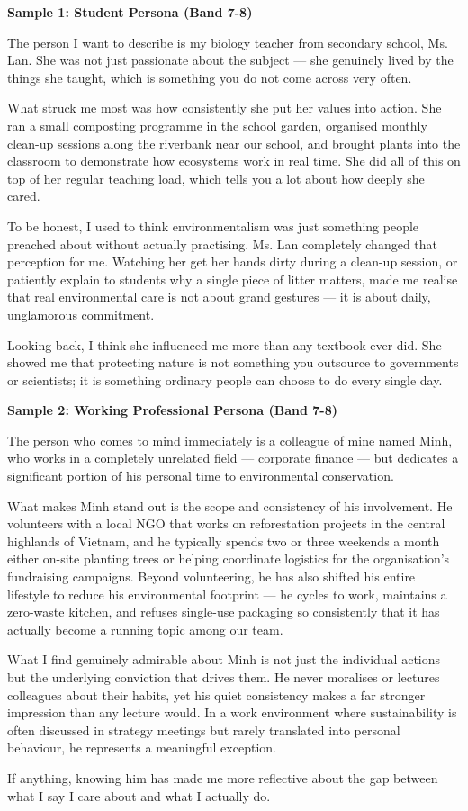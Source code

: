 \begin{ieltsanswer}
\textbf{Sample 1: Student Persona (Band 7-8)}

The person I want to describe is my biology teacher from secondary school, Ms. Lan. She was not just passionate about the subject — she genuinely lived by the things she taught, which is something you do not come across very often.

What struck me most was how consistently she put her values into action. She ran a small composting programme in the school garden, organised monthly clean-up sessions along the riverbank near our school, and brought plants into the classroom to demonstrate how ecosystems work in real time. She did all of this on top of her regular teaching load, which tells you a lot about how deeply she cared.

To be honest, I used to think environmentalism was just something people preached about without actually practising. Ms. Lan completely changed that perception for me. Watching her get her hands dirty during a clean-up session, or patiently explain to students why a single piece of litter matters, made me realise that real environmental care is not about grand gestures — it is about daily, unglamorous commitment.

Looking back, I think she influenced me more than any textbook ever did. She showed me that protecting nature is not something you outsource to governments or scientists; it is something ordinary people can choose to do every single day.

\textbf{Sample 2: Working Professional Persona (Band 7-8)}

The person who comes to mind immediately is a colleague of mine named Minh, who works in a completely unrelated field — corporate finance — but dedicates a significant portion of his personal time to environmental conservation.

What makes Minh stand out is the scope and consistency of his involvement. He volunteers with a local NGO that works on reforestation projects in the central highlands of Vietnam, and he typically spends two or three weekends a month either on-site planting trees or helping coordinate logistics for the organisation's fundraising campaigns. Beyond volunteering, he has also shifted his entire lifestyle to reduce his environmental footprint — he cycles to work, maintains a zero-waste kitchen, and refuses single-use packaging so consistently that it has actually become a running topic among our team.

What I find genuinely admirable about Minh is not just the individual actions but the underlying conviction that drives them. He never moralises or lectures colleagues about their habits, yet his quiet consistency makes a far stronger impression than any lecture would. In a work environment where sustainability is often discussed in strategy meetings but rarely translated into personal behaviour, he represents a meaningful exception.

If anything, knowing him has made me more reflective about the gap between what I say I care about and what I actually do.
\end{ieltsanswer}


